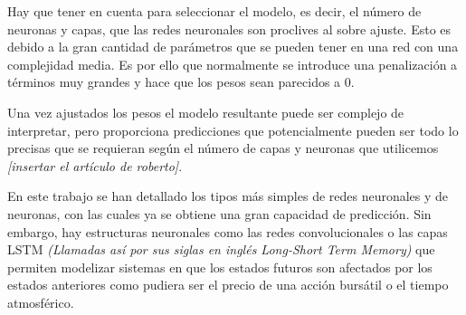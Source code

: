 \noindent Hay que tener en cuenta para seleccionar el modelo, es decir, el número de neuronas y capas, que las redes neuronales son proclives al sobre ajuste. Esto es debido a la gran cantidad de parámetros que se pueden tener en una red con una complejidad media. Es por ello que normalmente se introduce una penalización a términos muy grandes y hace que los pesos sean parecidos a 0.

\noindent Una vez ajustados los pesos el modelo resultante puede ser complejo de interpretar, pero proporciona predicciones que potencialmente pueden ser todo lo precisas que se requieran según el número de capas y neuronas que utilicemos \textit{[insertar el artículo de roberto]}. 


\noindent En este trabajo se han detallado los tipos más simples de redes neuronales y de neuronas, con las cuales ya se obtiene una gran capacidad de predicción. Sin embargo, hay estructuras neuronales como las redes convolucionales o las capas LSTM \textit{(Llamadas así por sus siglas en inglés Long-Short Term Memory)} que permiten modelizar sistemas en que los estados futuros son afectados por los estados anteriores como pudiera ser el precio de una acción bursátil o el tiempo atmosférico.
